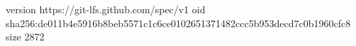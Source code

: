 version https://git-lfs.github.com/spec/v1
oid sha256:de011b4e5916b8beb5571c1c6ce0102651371482ccc5b953decd7c0b1960cfc8
size 2872
